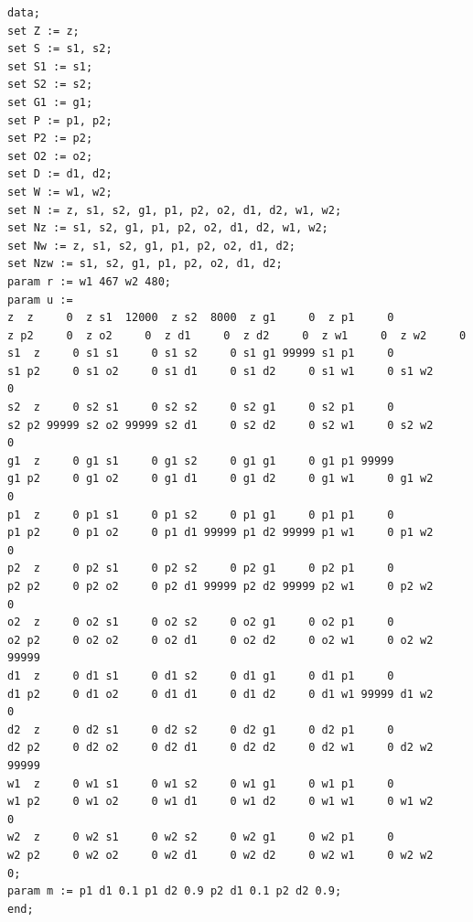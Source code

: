 \begin{lstlisting}[caption= plik dat]
data;
set Z := z;
set S := s1, s2;
set S1 := s1;
set S2 := s2;
set G1 := g1;
set P := p1, p2;
set P2 := p2;
set O2 := o2;
set D := d1, d2;
set W := w1, w2;
set N := z, s1, s2, g1, p1, p2, o2, d1, d2, w1, w2;
set Nz := s1, s2, g1, p1, p2, o2, d1, d2, w1, w2;
set Nw := z, s1, s2, g1, p1, p2, o2, d1, d2;
set Nzw := s1, s2, g1, p1, p2, o2, d1, d2;
param r := w1 467 w2 480;
param u := 
z  z     0  z s1  12000  z s2  8000  z g1     0  z p1     0 
z p2     0  z o2     0  z d1     0  z d2     0  z w1     0  z w2     0 
s1  z     0 s1 s1     0 s1 s2     0 s1 g1 99999 s1 p1     0 
s1 p2     0 s1 o2     0 s1 d1     0 s1 d2     0 s1 w1     0 s1 w2     0 
s2  z     0 s2 s1     0 s2 s2     0 s2 g1     0 s2 p1     0 
s2 p2 99999 s2 o2 99999 s2 d1     0 s2 d2     0 s2 w1     0 s2 w2     0 
g1  z     0 g1 s1     0 g1 s2     0 g1 g1     0 g1 p1 99999 
g1 p2     0 g1 o2     0 g1 d1     0 g1 d2     0 g1 w1     0 g1 w2     0 
p1  z     0 p1 s1     0 p1 s2     0 p1 g1     0 p1 p1     0 
p1 p2     0 p1 o2     0 p1 d1 99999 p1 d2 99999 p1 w1     0 p1 w2     0 
p2  z     0 p2 s1     0 p2 s2     0 p2 g1     0 p2 p1     0 
p2 p2     0 p2 o2     0 p2 d1 99999 p2 d2 99999 p2 w1     0 p2 w2     0 
o2  z     0 o2 s1     0 o2 s2     0 o2 g1     0 o2 p1     0 
o2 p2     0 o2 o2     0 o2 d1     0 o2 d2     0 o2 w1     0 o2 w2 99999 
d1  z     0 d1 s1     0 d1 s2     0 d1 g1     0 d1 p1     0 
d1 p2     0 d1 o2     0 d1 d1     0 d1 d2     0 d1 w1 99999 d1 w2     0 
d2  z     0 d2 s1     0 d2 s2     0 d2 g1     0 d2 p1     0 
d2 p2     0 d2 o2     0 d2 d1     0 d2 d2     0 d2 w1     0 d2 w2 99999 
w1  z     0 w1 s1     0 w1 s2     0 w1 g1     0 w1 p1     0 
w1 p2     0 w1 o2     0 w1 d1     0 w1 d2     0 w1 w1     0 w1 w2     0 
w2  z     0 w2 s1     0 w2 s2     0 w2 g1     0 w2 p1     0 
w2 p2     0 w2 o2     0 w2 d1     0 w2 d2     0 w2 w1     0 w2 w2     0;
param m := p1 d1 0.1 p1 d2 0.9 p2 d1 0.1 p2 d2 0.9;
end;
\end{lstlisting}


